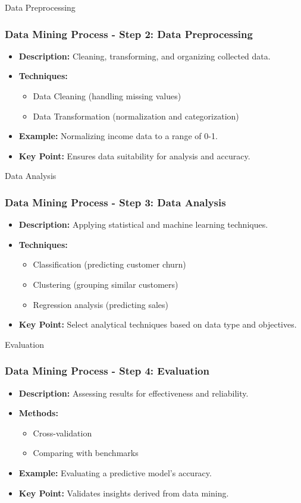 \documentclass[aspectratio=169]{beamer}
\begin{document}
\begin{frame}[fragile]{Data Preprocessing}
    \frametitle{Data Mining Process - Step 2: Data Preprocessing}
    \begin{itemize}
        \item \textbf{Description:} Cleaning, transforming, and organizing collected data.
        \item \textbf{Techniques:}
        \begin{itemize}
            \item Data Cleaning (handling missing values)
            \item Data Transformation (normalization and categorization)
        \end{itemize}
        \item \textbf{Example:} Normalizing income data to a range of 0-1.
        \item \textbf{Key Point:} Ensures data suitability for analysis and accuracy.
    \end{itemize}
\end{frame}

\begin{frame}[fragile]{Data Analysis}
    \frametitle{Data Mining Process - Step 3: Data Analysis}
    \begin{itemize}
        \item \textbf{Description:} Applying statistical and machine learning techniques.
        \item \textbf{Techniques:}
        \begin{itemize}
            \item Classification (predicting customer churn)
            \item Clustering (grouping similar customers)
            \item Regression analysis (predicting sales)
        \end{itemize}
        \item \textbf{Key Point:} Select analytical techniques based on data type and objectives.
    \end{itemize}
\end{frame}

\begin{frame}[fragile]{Evaluation}
    \frametitle{Data Mining Process - Step 4: Evaluation}
    \begin{itemize}
        \item \textbf{Description:} Assessing results for effectiveness and reliability.
        \item \textbf{Methods:} 
        \begin{itemize}
            \item Cross-validation
            \item Comparing with benchmarks
        \end{itemize}
        \item \textbf{Example:} Evaluating a predictive model's accuracy.
        \item \textbf{Key Point:} Validates insights derived from data mining.
    \end{itemize}
\end{frame}
\end{document}

